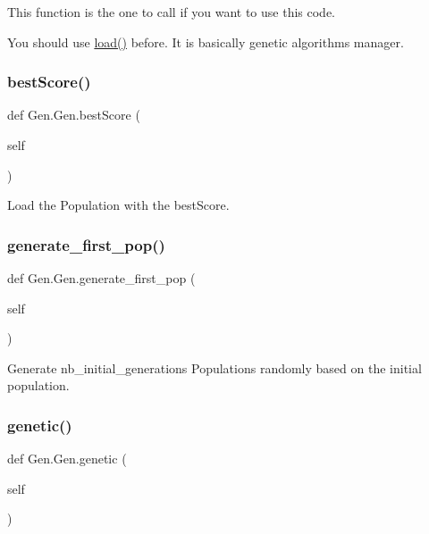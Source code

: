 This function is the one to call if you want to use this code. 

You should use \mbox{\hyperlink{classGen_1_1Gen_a622c81f69a1c66c602b53c4e129d4ef0}{load()}} before. It is basically genetic algorithm\textquotesingle{}s manager. \mbox{\label{classGen_1_1Gen_a01f71de519b17878844ea430a8d7bfea}} 
\subsubsection{\texorpdfstring{bestScore()}{bestScore()}}
{\footnotesize\ttfamily def Gen.\+Gen.\+best\+Score (\begin{DoxyParamCaption}\item[{}]{self }\end{DoxyParamCaption})}



Load the Population with the best\+Score. 

\mbox{\label{classGen_1_1Gen_a84990316f7099293e11beb6db22af61a}} 
\subsubsection{\texorpdfstring{generate\_first\_pop()}{generate\_first\_pop()}}
{\footnotesize\ttfamily def Gen.\+Gen.\+generate\+\_\+first\+\_\+pop (\begin{DoxyParamCaption}\item[{}]{self }\end{DoxyParamCaption})}



Generate nb\+\_\+initial\+\_\+generations Populations randomly based on the initial population. 

\mbox{\label{classGen_1_1Gen_a1cfc3669f55357cea08509b0ed5cd1bf}} 
\subsubsection{\texorpdfstring{genetic()}{genetic()}}
{\footnotesize\ttfamily def Gen.\+Gen.\+genetic (\begin{DoxyParamCaption}\item[{}]{self }\end{DoxyParamCaption})}



